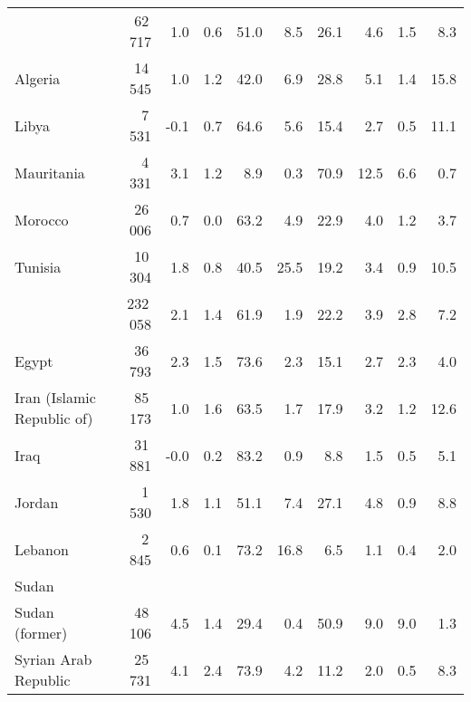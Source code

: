 \begin{longtable}{p{3cm}<{\raggedright}d{7.0}d{2.1}d{1.1}d{2.1}d{2.1}d{2.1}d{2.1}d{1.1}d{2.1}}
   & 62\,717 & 1.0 & 0.6 & 51.0 & 8.5 & 26.1 & 4.6 & 1.5 & 8.3 \\ 
     \hspace{2pt}\hangindent=4pt\relax Algeria & 14\,545 & 1.0 & 1.2 & 42.0 & 6.9 & 28.8 & 5.1 & 1.4 & 15.8 \\ 
     \hspace{2pt}\hangindent=4pt\relax Libya & 7\,531 & -0.1 & 0.7 & 64.6 & 5.6 & 15.4 & 2.7 & 0.5 & 11.1 \\ 
     \hspace{2pt}\hangindent=4pt\relax Mauritania & 4\,331 & 3.1 & 1.2 & 8.9 & 0.3 & 70.9 & 12.5 & 6.6 & 0.7 \\ 
     \hspace{2pt}\hangindent=4pt\relax Morocco & 26\,006 & 0.7 & 0.0 & 63.2 & 4.9 & 22.9 & 4.0 & 1.2 & 3.7 \\ 
     \hspace{2pt}\hangindent=4pt\relax Tunisia & 10\,304 & 1.8 & 0.8 & 40.5 & 25.5 & 19.2 & 3.4 & 0.9 & 10.5 \\ 
   & 232\,058 & 2.1 & 1.4 & 61.9 & 1.9 & 22.2 & 3.9 & 2.8 & 7.2 \\ 
     \hspace{2pt}\hangindent=4pt\relax Egypt & 36\,793 & 2.3 & 1.5 & 73.6 & 2.3 & 15.1 & 2.7 & 2.3 & 4.0 \\ 
     \hspace{2pt}\hangindent=4pt\relax Iran (Islamic Republic of) & 85\,173 & 1.0 & 1.6 & 63.5 & 1.7 & 17.9 & 3.2 & 1.2 & 12.6 \\ 
     \hspace{2pt}\hangindent=4pt\relax Iraq & 31\,881 & -0.0 & 0.2 & 83.2 & 0.9 & 8.8 & 1.5 & 0.5 & 5.1 \\ 
     \hspace{2pt}\hangindent=4pt\relax Jordan & 1\,530 & 1.8 & 1.1 & 51.1 & 7.4 & 27.1 & 4.8 & 0.9 & 8.8 \\ 
     \hspace{2pt}\hangindent=4pt\relax Lebanon & 2\,845 & 0.6 & 0.1 & 73.2 & 16.8 & 6.5 & 1.1 & 0.4 & 2.0 \\ 
     \hspace{2pt}\hangindent=4pt\relax Sudan &  &  &  &  &  &  &  &  &  \\ 
     \hspace{2pt}\hangindent=4pt\relax Sudan (former) & 48\,106 & 4.5 & 1.4 & 29.4 & 0.4 & 50.9 & 9.0 & 9.0 & 1.3 \\ 
     \hspace{2pt}\hangindent=4pt\relax Syrian Arab Republic & 25\,731 & 4.1 & 2.4 & 73.9 & 4.2 & 11.2 & 2.0 & 0.5 & 8.3 \\ 

\end{longtable}

